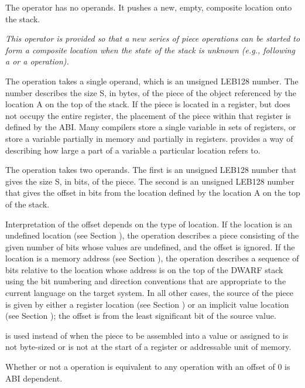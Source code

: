 \begin{enumerate}[1. ]

\itembfnl{\DWOPcompositeTARG}
The \DWOPcompositeNAME{} operator has no operands. It pushes a new,
empty, composite location onto the stack.

\textit{This operator is provided so that a new series of piece
operations can be started to form a composite location when the
state of the stack is unknown (e.g., following a \DWOPcalltwoNAME or a
\DWOPcallfourNAME operation).}

\itembfnl{\DWOPpieceTARG}
The \DWOPpieceNAME{} operation takes a single operand, which is an
unsigned LEB128  number. The number
describes the size S, in bytes, of the piece of the object referenced
by the location A on the top of the stack. If the piece is located in
a register, but does not occupy the entire register, the placement of
the piece within that register is defined by the ABI. Many compilers
store a single variable in sets of registers, or store a variable
partially in memory and partially in registers.  \DWOPpieceNAME{}
provides a way of describing how large a part of a variable a
particular location refers to.

\itembfnl{\DWOPbitpieceTARG}
The \DWOPbitpieceNAME{} operation takes two operands. The first is an
unsigned LEB128 number that gives the
size S, in bits, of the piece. The second is an unsigned
LEB128 number that gives the offset in
bits from the location defined by the location A on the top of the
stack.

Interpretation of the offset depends on the type of location. If the
location is an undefined location (see Section
), the \DWOPbitpieceNAME{} operation
describes a piece consisting of the given number of bits whose values
are undefined, and the offset is ignored. If the location is a memory
address (see Section ),
the\DWOPbitpieceNAME{} operation describes a sequence of bits relative
to the location whose address is on the top of the DWARF stack using
the bit numbering and direction conventions that are appropriate to
the current language on the target system. In all other cases, the
source of the piece is given by either a register location (see
Section ) or an implicit value
location (see Section ); the offset
is from the least significant bit of the source value.

\DWOPbitpieceNAME{} is used instead of \DWOPpieceNAME{} when the piece
to be assembled into a value or assigned to is not byte-sized or is
not at the start of a register or addressable unit of memory.

Whether or not a \DWOPpieceNAME{} operation is equivalent to any
\DWOPbitpieceNAME{} operation with an offset of 0 is ABI dependent.
\end{enumerate}

